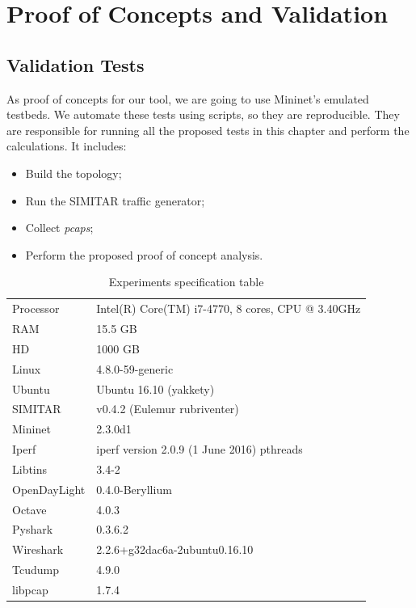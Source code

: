 \chapter{Proof of Concepts and Validation}\label{ch:validation}


\section{Validation Tests}

As proof of concepts for our tool, we are going to use Mininet's emulated testbeds. We automate these tests using scripts, so they are reproducible. They are responsible for running all the proposed tests in this chapter and perform the calculations. It includes:

\begin{itemize}
	\item Build the topology;
	\item Run the SIMITAR traffic generator;
	\item Collect \textit{pcaps};
	\item Perform the proposed proof of concept analysis. 
\end{itemize}


\begin{table}[ht!]
	\centering
	\caption{Experiments specification table}
	\label{tab:specifications}
	\begin{tabular}{ll}
		\hline
		Processor            & Intel(R) Core(TM) i7-4770, 8 cores, CPU @ 3.40GHz \\
		RAM                  & 15.5 GB                                           \\
		HD                   & 1000 GB                                           \\
		Linux         & 4.8.0-59-generic                                  \\
		Ubuntu        & Ubuntu 16.10 (yakkety)                            \\
		SIMITAR       & v0.4.2 (Eulemur rubriventer)                      \\
		Mininet       & 2.3.0d1                                           \\
		Iperf         & iperf version 2.0.9 (1 June 2016) pthreads        \\
		Libtins       & 3.4-2                                             \\
		OpenDayLight  & 0.4.0-Beryllium                                   \\
		Octave        & 4.0.3                                             \\
		Pyshark       & 0.3.6.2                                     \\
		Wireshark     & 2.2.6+g32dac6a-2ubuntu0.16.10               \\
		Tcudump       & 4.9.0 \\
		libpcap       & 1.7.4\\
		\hline
	\end{tabular}
\end{table}


